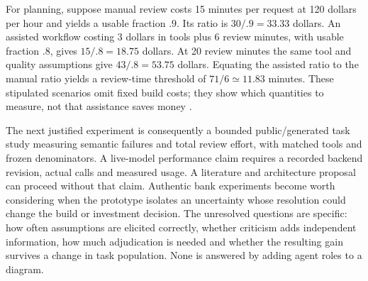 For planning, suppose manual review costs 15 minutes per request at 120 dollars
per hour and yields a usable fraction $.9$. Its ratio is $30/.9=33.33$ dollars.
An assisted workflow costing 3 dollars in tools plus 6 review minutes, with
usable fraction $.8$, gives $15/.8=18.75$ dollars. At 20 review minutes the
same tool and quality assumptions give $43/.8=53.75$ dollars. Equating the
assisted ratio to the manual ratio yields a review-time threshold of
$71/6\simeq11.83$ minutes. These stipulated scenarios omit fixed build costs;
they show which quantities to measure, not that assistance saves money
\citep{exec13_architecture_exact}.

The next justified experiment is consequently a bounded public/generated task
study measuring semantic failures and total review effort, with matched tools
and frozen denominators. A live-model performance claim requires a recorded
backend revision, actual calls and measured usage. A literature and architecture
proposal can proceed without that claim. Authentic bank experiments become
worth considering when the prototype isolates an uncertainty whose resolution
could change the build or investment decision. The unresolved questions are
specific: how often assumptions are elicited correctly, whether criticism adds
independent information, how much adjudication is needed and whether the
resulting gain survives a change in task population. None is answered by adding
agent roles to a diagram.
\label{exec13:agent-architecture-end}
